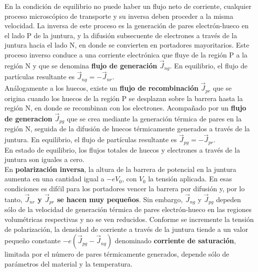 \documentclass[oneside]{book}
\numberwithin{equation}{section}
\numberwithin{figure}{section}
\numberwithin{table}{section}
\begin{document}
				En la condición de equilibrio no puede haber un flujo neto de corriente, cualquier proceso microscópico de transporte y su inversa deben proceder a la misma velocidad. La inversa de este proceso es la generación de pares electrón-hueco en el lado P de la juntura, y la difusión subsecuente de electrones a través de la juntura hacia el lado N, en donde se convierten en portadores mayoritarios. Este proceso inverso conduce a una corriente electrónica que fluye de la región P a la región N y que se denomina \textbf{flujo de generación} $\vec{J}_{ng}$. En equilibrio, el flujo de partículas resultante es $\vec{J}_{ng}=-\vec{J}_{nr}$.\\
				
				Análogamente a los huecos, existe un \textbf{flujo de recombinación} $\vec{J}_{pr}$ que se origina cuando los huecos de la región P se desplazan sobre la barrera hasta la región N, en donde se recombinan con los electrones. Acompañado por un \textbf{flujo de generacion} $\vec{J}_{pg}$ que se crea mediante la generación térmica de pares en la región N, seguida de la difusión de huecos térmicamente generados a través de la juntura. En equilibrio, el flujo de partículas resultante es $\vec{J}_{pg}=-\vec{J}_{pr}$.\\
				
				En estado de equilibrio, los flujos totales de huecos y electrones a través de la juntura son iguales a cero.\\
				
				En \textbf{polarización inversa}, la altura de la barrera de potencial en la juntura aumenta en una cantidad igual a $-eV_0$, con $V_0$ la tensión aplicada. En esas condiciones es difćil para los portadores vencer la barrera por difusión y, por lo tanto, \textbf{$\vec{J}_{nr}$ y $\vec{J}_{pr}$ se hacen muy pequeños}. Sin embargo, $\vec{J}_{ng}$ y $\vec{J}_{pg}$ depeden sólo de la velocidad de generación térmica de pares electrón-hueco en las regiones volumétricas respectivas y no se ven reducidos. Conforme se incremente la tensión de polarización, la densidad de corriente a través de la juntura tiende a un valor pequeño constante $-e(\vec{J}_{pg}-\vec{J}_{ng})$ denominado \textbf{corriente de saturación}, limitada por el número de pares térmicamente generados, depende sólo de parámetros del material y la temperatura.\\
				
\end{document}
